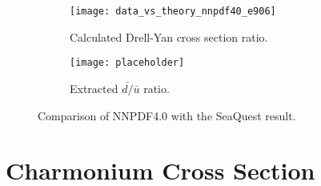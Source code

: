 \documentclass[../main.tex]{subfiles}
\begin{document}
\begin{figure}[htbp!]
	\centering
	\begin{subfigure}{0.45\linewidth}
		\texttt{[image: data\_vs\_theory\_nnpdf40\_e906]}
		\caption{Calculated Drell-Yan cross section ratio.}
		\label{subfig:nnpdf_e906_csr}
	\end{subfigure}
	\begin{subfigure}{0.45\linewidth}
		\texttt{[image: placeholder]}
		\caption{Extracted $\bar{d/}\bar{u}$ ratio.}
		\label{subfig:nnpdf_e906_x2}
	\end{subfigure}
	\caption{Comparison of NNPDF4.0\cite{ball2021} with the SeaQuest
		result\cite{dove2021}.}
	\label{fig:nnpdf_e906}
\end{figure}


\section{Charmonium Cross Section}
\end{document}
